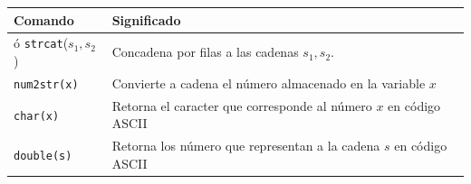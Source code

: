 \documentclass[11pt,legalpaper]{article}
\begin{document}
\begin{center}
\begin{tabular}{l|p{}}
\hline
Comando		& Significado \\
\hline
[$s_1,s_2$] \'o \texttt{strcat}($s_1,s_2$)	& Concadena por filas a las cadenas $s_1,s_2$.\\
\hline
\texttt{num2str(x)}	& Convierte a cadena el número almacenado en la variable $x$\\
\hline
\texttt{char(x)} 	& Retorna el caracter que corresponde al número $x$ en código ASCII\\
\hline
\texttt{double(s)} 	& Retorna los número que representan a la cadena $s$ en c\'odigo ASCII\\
\hline 
\end{tabular}
\end{center}
\end{document}
